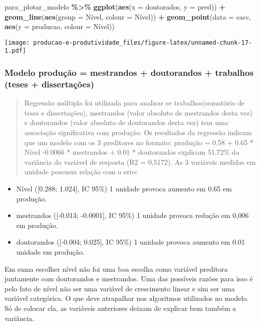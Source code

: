 \documentclass[
]{article}
\newenvironment{Shaded}{\begin{snugshade}}{\end{snugshade}}
\newcommand{\AttributeTok}[1]{\textcolor[rgb]{0.13,0.29,0.53}{#1}}
\newcommand{\FunctionTok}[1]{\textcolor[rgb]{0.13,0.29,0.53}{\textbf{#1}}}
\newcommand{\NormalTok}[1]{#1}
\newcommand{\SpecialCharTok}[1]{\textcolor[rgb]{0.81,0.36,0.00}{\textbf{#1}}}
\providecommand{\tightlist}{%
  \setlength{\itemsep}{0pt}\setlength{\parskip}{0pt}}
\begin{document}
\begin{Shaded}
\begin{Highlighting}[]
\NormalTok{para\_plotar\_modelo }\SpecialCharTok{\%\textgreater{}\%} 
  \FunctionTok{ggplot}\NormalTok{(}\FunctionTok{aes}\NormalTok{(}\AttributeTok{x =}\NormalTok{ doutorados, }\AttributeTok{y =}\NormalTok{ pred)) }\SpecialCharTok{+} 
  \FunctionTok{geom\_line}\NormalTok{(}\FunctionTok{aes}\NormalTok{(}\AttributeTok{group =}\NormalTok{ Nível, }\AttributeTok{colour =}\NormalTok{ Nível)) }\SpecialCharTok{+} 
  \FunctionTok{geom\_point}\NormalTok{(}\AttributeTok{data =}\NormalTok{ cacc, }\FunctionTok{aes}\NormalTok{(}\AttributeTok{y =}\NormalTok{ producao, }\AttributeTok{colour =}\NormalTok{ Nível))}
\end{Highlighting}
\end{Shaded}

\texttt{[image: producao-e-produtividade\_files/figure-latex/unnamed-chunk-17-1.pdf]}

\hypertarget{modelo-produuxe7uxe3o-mestrandos-doutorandos-trabalhos-teses-dissertauxe7uxf5es}{%
\subsubsection{Modelo produção = mestrandos + doutorandos + trabalhos
(teses +
dissertações)}\label{modelo-produuxe7uxe3o-mestrandos-doutorandos-trabalhos-teses-dissertauxe7uxf5es}}

\begin{quote}
Regressão múltipla foi utilizada para analisar se trabalhos(somatório de
teses e dissertações), mestrandos (valor absoluto de mestrandos desta
vez) e doutorandos (valor absoluto de doutorandos desta vez) tem uma
associação significativa com produção. Os resultados da regressão
indicam que um modelo com os 3 preditores no formato: produção = 0.58 +
0.65 * Nível -0.0066 * mestrandos + 0.01 * doutorandos explicam 51,72\%
da variância da variável de resposta (R2 = 0,5172). As 3 variáveis
medidas em unidade possuem relação com o erro:
\end{quote}

\begin{itemize}
\tightlist
\item
  Nível ({[}0.288; 1.024{]}, IC 95\%) 1 unidade provoca aumento em 0.65
  em produção.
\item
  mestrandos ({[}-0.013; -0.0001{]}, IC 95\%) 1 unidade provoca redução
  em 0,006 em produção.
\item
  doutorandos ({[}-0.004; 0.025{]}, IC 95\%) 1 unidade provoca aumento
  em 0.01 unidade em produção.
\end{itemize}

Em suma escolher nível não foi uma boa escolha como variável preditora
juntamente com doutorandos e mestrandos. Uma das possíveis razões para
isso é pelo fato de nível não ser uma variável de crescimento linear e
sim ser uma variável categórica. O que deve atrapalhar nos algoritmos
utilizados no modelo. Só de colocar ela, as variáveis anteriores deixam
de explicar bem também a variância.
\end{document}
